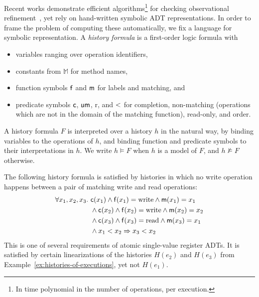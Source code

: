 Recent works demonstrate efficient algorithms\footnote{In time polynomial in
the number of operations, per execution.} for checking observational
refinement~\cite{conf/popl/BouajjaniEEH15, conf/pldi/EmmiEH15}, yet rely on
hand-written symbolic ADT representations. In order to frame the problem of
computing these automatically, we fix a language for symbolic representation. A
\emph{history formula} is a first-order logic formula with
\begin{itemize}

  \item variables ranging over operation identifiers,

  \item constants from $\mathbb{M}$ for method names,

  \item function symbols ${\sf f}$ and ${\sf m}$ for labels and matching, and

  \item predicate symbols ${\sf c}$, ${\sf um}$, {\sf r}, and ${\sf <}$ for completion,
  non-matching (operations which are not in the domain of the matching function), read-only, and order.

\end{itemize}
A history formula $F$ is interpreted over a history $h$ in the natural way, by
binding variables to the operations of $h$, and binding function and predicate
symbols to their interpretations in $h$. We write $h \models F$ when $h$ is a
model of $F$, and $h \not\models F$ otherwise.

\begin{example}

  The following history formula is satisfied by histories in which no write
  operation happens between a pair of matching write and read operations:
  \begin{align*}
    \forall x_1, x_2, x_3.\
    & {\sf c}(x_1) \land {\sf f}(x_1) = \mathrm{write} \land {\sf m}(x_1) = x_1 \\
    & \land {\sf c}(x_2) \land {\sf f}(x_2) = \mathrm{write} \land {\sf m}(x_2) = x_2 \\
    & \land {\sf c}(x_3) \land {\sf f}(x_3) = \mathrm{read} \land {\sf m}(x_3) = x_1 \\
    & \land x_1 < x_2
      \implies x_3 < x_2
  \end{align*}
  This is one of several requirements of atomic single-value register ADTs.
  It is satisfied by certain linearizations of the histories $H(e_2)$ and
  $H(e_3)$ from Example~\ref{ex:histories-of-executions}, yet not $H(e_1)$.

\end{example}

